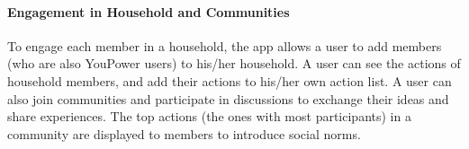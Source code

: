 \paragraph{Engagement in Household and Communities} 
To engage each member in a household, the app allows a user to add members (who are also YouPower users) to his/her household. 
A user can see the actions of household members, and add their actions to his/her own action list.
% 
A user can also join communities and participate in discussions to exchange their ideas and share experiences. The top actions (the ones with most participants) in a community are displayed to members to introduce social norms. 





